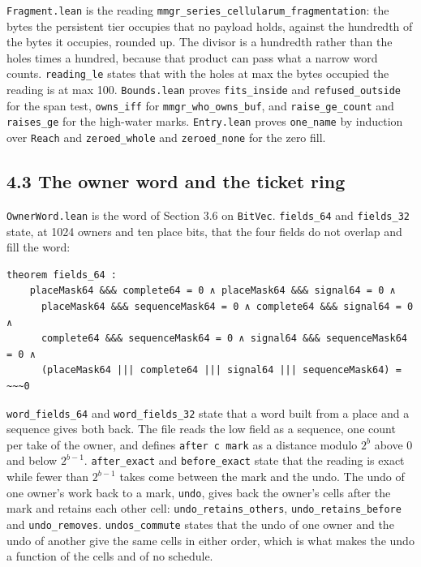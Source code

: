 \texttt{Fragment.\allowbreak{}lean} is the reading \texttt{mmgr\_\allowbreak{}series\_\allowbreak{}cellularum\_\allowbreak{}fragmentation}: the bytes the persistent tier occupies that no payload holds, against the hundredth of the bytes it occupies, rounded up. The divisor is a hundredth rather than the holes times a hundred, because that product can pass what a narrow word counts. \texttt{reading\_\allowbreak{}le} states that with the holes at max the bytes occupied the reading is at max 100. \texttt{Bounds.\allowbreak{}lean} proves \texttt{fits\_\allowbreak{}inside} and \texttt{refused\_\allowbreak{}outside} for the span test, \texttt{owns\_\allowbreak{}iff} for \texttt{mmgr\_\allowbreak{}who\_\allowbreak{}owns\_\allowbreak{}buf}, and \texttt{raise\_\allowbreak{}ge\_\allowbreak{}count} and \texttt{raises\_\allowbreak{}ge} for the high-water marks. \texttt{Entry.\allowbreak{}lean} proves \texttt{one\_\allowbreak{}name} by induction over \texttt{Reach} and \texttt{zeroed\_\allowbreak{}whole} and \texttt{zeroed\_\allowbreak{}none} for the zero fill.

\subsection{\texorpdfstring{4.3 The owner word and the ticket ring}{4.3 The owner word and the ticket ring}}

\texttt{Owner\allowbreak{}Word.\allowbreak{}lean} is the word of Section 3.6 on \texttt{Bit\allowbreak{}Vec}. \texttt{fields\_\allowbreak{}64} and \texttt{fields\_\allowbreak{}32} state, at 1024 owners and ten place bits, that the four fields do not overlap and fill the word:

\begin{Verbatim}
theorem fields_64 :
    placeMask64 &&& complete64 = 0 ∧ placeMask64 &&& signal64 = 0 ∧
      placeMask64 &&& sequenceMask64 = 0 ∧ complete64 &&& signal64 = 0 ∧
      complete64 &&& sequenceMask64 = 0 ∧ signal64 &&& sequenceMask64 = 0 ∧
      (placeMask64 ||| complete64 ||| signal64 ||| sequenceMask64) = ~~~0
\end{Verbatim}

\texttt{word\_\allowbreak{}fields\_\allowbreak{}64} and \texttt{word\_\allowbreak{}fields\_\allowbreak{}32} state that a word built from a place and a sequence gives both back. The file reads the low field as a sequence, one count per take of the owner, and defines \texttt{after c mark} as a distance modulo \(2^b\) above 0 and below \(2^{b-1}\). \texttt{after\_\allowbreak{}exact} and \texttt{before\_\allowbreak{}exact} state that the reading is exact while fewer than \(2^{b-1}\) takes come between the mark and the undo. The undo of one owner's work back to a mark, \texttt{undo}, gives back the owner's cells after the mark and retains each other cell: \texttt{undo\_\allowbreak{}retains\_\allowbreak{}others}, \texttt{undo\_\allowbreak{}retains\_\allowbreak{}before} and \texttt{undo\_\allowbreak{}removes}. \texttt{undos\_\allowbreak{}commute} states that the undo of one owner and the undo of another give the same cells in either order, which is what makes the undo a function of the cells and of no schedule.

